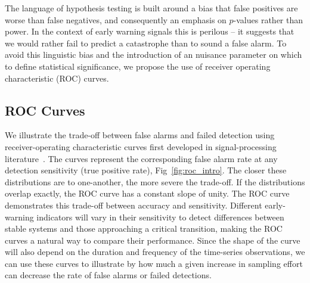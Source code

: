 \documentclass[authoryear,review,11pt]{elsarticle}
\begin{document}
The language of hypothesis testing is built around a bias that false positives are worse than false negatives,
and consequently an emphasis on $p$-values rather than power.
In the context of early warning signals this is perilous --
it suggests that we would rather fail to predict a catastrophe than to sound a false alarm.
To avoid this linguistic bias and the introduction of an nuisance parameter on which to define statistical significance,
we propose the use of receiver operating characteristic (ROC) curves.

\subsection*{ROC Curves}
We illustrate the trade-off between false alarms and failed detection using
receiver-operating characteristic curves first developed in signal-processing literature~\citep{Green1989, Keller2009}⁠.
The curves represent the corresponding false alarm rate at any detection sensitivity (true positive rate), Fig~\ref{fig:roc_intro}.
The closer these distributions are to one-another, the more severe the trade-off.
If the distributions overlap exactly, the ROC curve has a constant slope of unity.
The ROC curve demonstrates this trade-off between accuracy and sensitivity.
Different early-warning indicators will vary in their sensitivity to detect differences
between stable systems and those approaching a critical transition,
making the ROC curves a natural way to compare their performance.
Since the shape of the curve will also depend on the duration and frequency of the time-series observations,
we can use these curves to illustrate by how much a given increase in sampling effort can decrease the rate of false alarms or failed detections.
\end{document}
